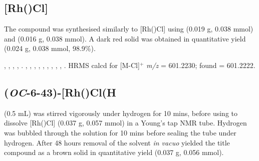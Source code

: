 
\subsection*{[Rh(\tBuxantphosk)Cl]}


The compound was synthesised similarly to [Rh(\tBusixantphos)Cl] using \tBuxantphos{} (0.019 g, 0.038 mmol) and  (0.016 g, 0.038 mmol).  A dark red solid was obtained in quantitative yield (0.024 g, 0.038 mmol, 98.9\%).  

,
,
,
,
.
,
,
,
,
,
,
,
,
,
.
HRMS calcd for  [M-Cl]$^+$ \emph{m/z} = 601.2230; found = 601.2222.



\subsection*{(\emph{OC}-6-43)-\texorpdfstring{[Rh(\tBusixantphosk)Cl(H\ce{)2]}}R}


 (0.5 mL) was stirred vigorously under hydrogen for 10 mins, before using to dissolve [Rh(\tBusixantphos)Cl] (0.037 g, 0.057 mmol) in a Young's tap NMR tube.  Hydrogen was bubbled through the solution for 10 mins before sealing the tube under hydrogen.  After 48 hours removal of the solvent \emph{in vacuo} yielded the title compound as a brown solid in quantitative yield (0.037 g, 0.056 mmol).  

